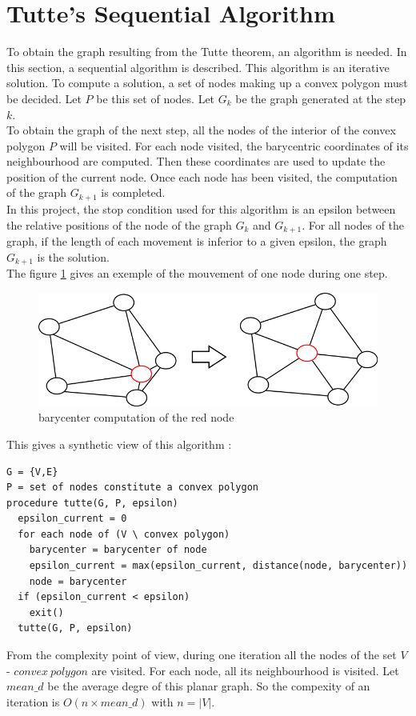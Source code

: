 \section{Tutte's Sequential Algorithm}

To obtain the graph resulting from the Tutte theorem, an algorithm is
needed. In this section, a sequential algorithm is described. This
algorithm is an iterative solution. To compute a solution, a set of nodes
 making up a convex polygon must be decided. Let $P$ be this set of nodes. Let
$G_k$ be the graph generated at the step $k$.
\\

To obtain the graph of the next step, all the nodes of the interior of the
convex polygon $P$ will be visited. For each node visited, the barycentric
coordinates of its neighbourhood are computed. Then these coordinates are used
to update the position of the current node. Once each node has been visited,
the computation of the graph $G_{k+1}$ is completed.
\\
In this project, the stop condition used for this algorithm is an epsilon
between the relative positions of the node of the graph $G_k$ and
$G_{k+1}$. For all nodes of the graph, if the length of each movement is
inferior to a given epsilon, the graph $G_{k+1}$ is the solution.
\\

The figure \ref{transition} gives an exemple of the mouvement of one node
during one step.
\begin{figure}[!h]
\centering
\includegraphics[scale=0.5]{img/transition.png}
\caption{barycenter computation of the red node}
\label{transition}
\end{figure}

This gives a synthetic view of this algorithm : 
\begin{verbatim}
G = {V,E}
P = set of nodes constitute a convex polygon
procedure tutte(G, P, epsilon)
  epsilon_current = 0
  for each node of (V \ convex polygon)
    barycenter = barycenter of node
    epsilon_current = max(epsilon_current, distance(node, barycenter))
    node = barycenter
  if (epsilon_current < epsilon)
    exit()
  tutte(G, P, epsilon)
\end{verbatim}

From the complexity point of view, during one iteration all the nodes of
the set $V$ - $convex~polygon$ are visited. For each node, all its
neighbourhood is visited. Let $mean\_d$ be the average degre of this planar
graph. So the compexity of an iteration is $\mathit{O(n \times mean\_d)}$
with $n = |V|$.

